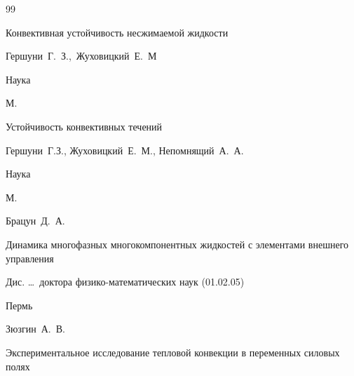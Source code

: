 \begin{thebibliography}{99}






\book Конвективная устойчивость несжимаемой жидкости

\by Гершуни~Г.~З.,~Жуховицкий~Е.~М


\publ Наука

\publaddr М.





\book Устойчивость конвективных течений

\by Гершуни~Г.З., Жуховицкий~Е.~М., Непомнящий~А.~А.


\publ Наука

\publaddr М.









\by Брацун~Д.~А.

\thesis Динамика многофазных многокомпонентных жидкостей с элементами внешнего управления 

\thesisinfo Дис. \dots\ доктора физико-математических наук (01.02.05)

\publaddr Пермь















\by Зюзгин~А.~В.

\thesis Экспериментальное исследование тепловой конвекции в переменных силовых полях


\end{thebibliography}
